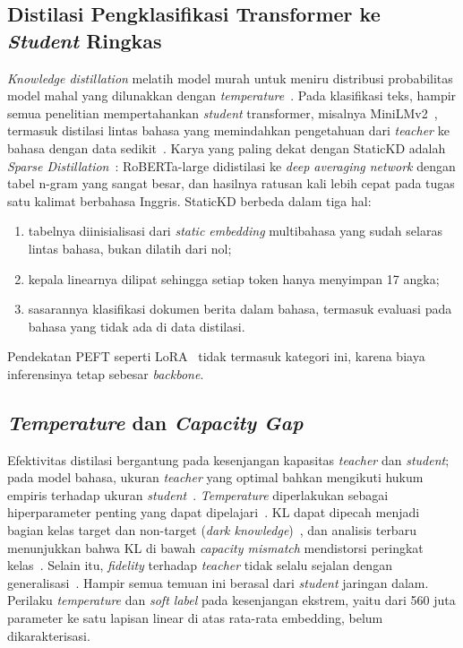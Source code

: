 \documentclass[journal]{IEEEtran}
\newcommand{\eng}[1]{\textit{#1}}   %
\begin{document}
\subsection{Distilasi Pengklasifikasi Transformer ke \eng{Student} Ringkas}
\eng{Knowledge distillation} melatih model murah untuk meniru distribusi probabilitas model mahal yang dilunakkan dengan \eng{temperature}~\cite{hinton2015distilling}. Pada klasifikasi teks, hampir semua penelitian mempertahankan \eng{student} transformer, misalnya MiniLMv2~\cite{wang2021minilmv2}, termasuk distilasi lintas bahasa yang memindahkan pengetahuan dari \eng{teacher} ke bahasa dengan data sedikit~\cite{piperno2025crosslingual}. Karya yang paling dekat dengan StaticKD adalah \eng{Sparse Distillation}~\cite{ye2022sparse}: RoBERTa-large didistilasi ke \eng{deep averaging network} dengan tabel n-gram yang sangat besar, dan hasilnya ratusan kali lebih cepat pada tugas satu kalimat berbahasa Inggris. StaticKD berbeda dalam tiga hal:
\begin{enumerate}
  \item tabelnya diinisialisasi dari \eng{static embedding} multibahasa yang sudah selaras lintas bahasa, bukan dilatih dari nol;
  \item kepala linearnya dilipat sehingga setiap token hanya menyimpan 17 angka;
  \item sasarannya klasifikasi dokumen berita dalam  bahasa, termasuk evaluasi pada bahasa yang tidak ada di data distilasi.
\end{enumerate}
Pendekatan PEFT seperti LoRA~\cite{hu2022lora,razuvayevskaya2024peft} tidak termasuk kategori ini, karena biaya inferensinya tetap sebesar \eng{backbone}.

\subsection{\eng{Temperature} dan \eng{Capacity Gap}}
Efektivitas distilasi bergantung pada kesenjangan kapasitas \eng{teacher} dan \eng{student}; pada model bahasa, ukuran \eng{teacher} yang optimal bahkan mengikuti hukum empiris terhadap ukuran \eng{student}~\cite{zhang2025law}. \eng{Temperature} diperlakukan sebagai hiperparameter penting yang dapat dipelajari~\cite{li2023ctkd}. KL dapat dipecah menjadi bagian kelas target dan non-target (\eng{dark knowledge})~\cite{zhao2022dkd}, dan analisis terbaru menunjukkan bahwa KL di bawah \eng{capacity mismatch} mendistorsi peringkat kelas~\cite{wang2026rckd}. Selain itu, \eng{fidelity} terhadap \eng{teacher} tidak selalu sejalan dengan generalisasi~\cite{stanton2021kd}. Hampir semua temuan ini berasal dari \eng{student} jaringan dalam. Perilaku \eng{temperature} dan \eng{soft label} pada kesenjangan ekstrem, yaitu dari 560 juta parameter ke satu lapisan linear di atas rata-rata embedding, belum dikarakterisasi.
\end{document}
